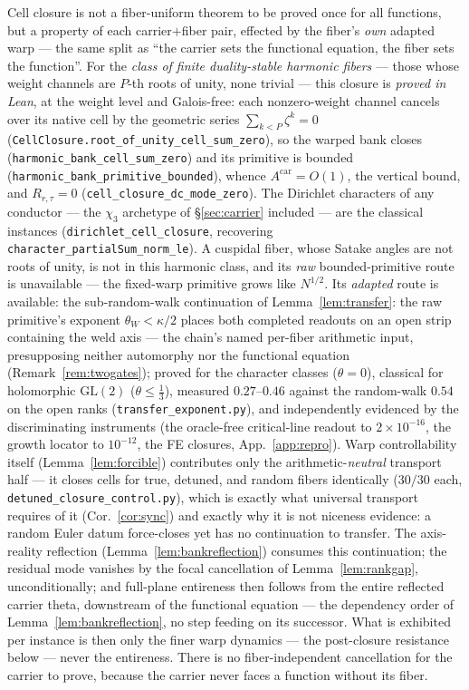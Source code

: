 \documentclass[11pt]{article}
\theoremstyle{definition}
\begin{document}
\noindent Cell closure is not a fiber-uniform theorem to be proved once for all functions, but a property
of each carrier$+$fiber pair, effected by the fiber's \emph{own} adapted warp --- the same split as ``the
carrier sets the functional equation, the fiber sets the function''. For the \emph{class of finite
duality-stable harmonic fibers} --- those whose weight channels are $P$-th roots of unity, none trivial ---
this closure is \emph{proved in Lean}, at the weight level and Galois-free: each nonzero-weight channel
cancels over its native cell by the geometric series $\sum_{k<P}\zeta^k=0$
(\texttt{CellClosure.root\_of\_unity\_cell\_sum\_zero}), so the warped bank closes
(\texttt{harmonic\_bank\_cell\_sum\_zero}) and its primitive is bounded
(\texttt{harmonic\_bank\_primitive\_bounded}), whence $A^{\mathrm{car}}=O(1)$, the vertical bound, and
$R_{r,\tau}=0$ (\texttt{cell\_closure\_dc\_mode\_zero}). The Dirichlet characters of any conductor ---
the $\chi_3$ archetype of \S\ref{sec:carrier} included --- are the classical instances
(\texttt{dirichlet\_cell\_closure}, recovering \texttt{character\_partialSum\_norm\_le}). A cuspidal fiber,
whose Satake angles are not roots of unity, is not in this harmonic class, and its \emph{raw} bounded-primitive
route is unavailable --- the fixed-warp primitive grows like $N^{1/2}$. Its \emph{adapted} route is available:
the sub-random-walk continuation of Lemma~\ref{lem:transfer}: the raw primitive's exponent
$\theta_W<\kappa/2$ places both completed readouts on an open strip containing the weld axis --- the chain's
named per-fiber arithmetic input, presupposing neither automorphy nor the functional equation
(Remark~\ref{rem:twogates}); proved for the character classes ($\theta=0$), classical for holomorphic
$\mathrm{GL}(2)$ ($\theta\le\tfrac13$), measured $0.27$--$0.46$ against the random-walk $0.54$ on the open
ranks (\texttt{transfer\_exponent.py}), and independently evidenced by the discriminating instruments (the
oracle-free critical-line readout to $2\times10^{-16}$, the growth locator to $10^{-12}$, the FE closures,
App.~\ref{app:repro}). Warp controllability itself (Lemma~\ref{lem:forcible}) contributes only the
arithmetic-\emph{neutral} transport half --- it closes cells for true, detuned, and random fibers identically
($30/30$ each, \texttt{detuned\_closure\_control.py}), which is exactly what universal transport requires of it
(Cor.~\ref{cor:sync}) and exactly why it is not niceness evidence: a random Euler datum force-closes yet has no
continuation to transfer. The axis-reality
reflection (Lemma~\ref{lem:bankreflection}) consumes this continuation; the residual mode vanishes by the focal
cancellation of Lemma~\ref{lem:rankgap}, unconditionally; and full-plane entireness then follows from the entire
reflected carrier theta, downstream of the functional equation --- the dependency order of
Lemma~\ref{lem:bankreflection}, no step feeding on its successor.
What is exhibited per instance is then only the finer warp dynamics --- the post-closure resistance below ---
never the entireness. There is no fiber-independent cancellation for the carrier to prove, because the
carrier never faces a function without its fiber.
\end{document}
